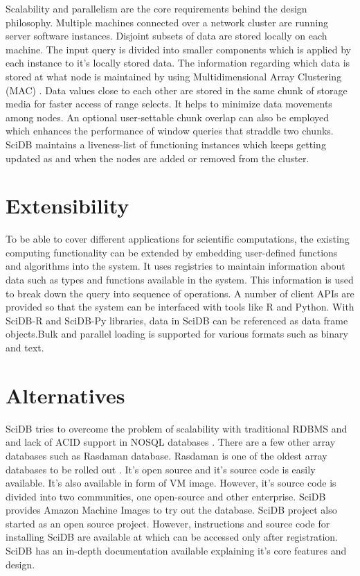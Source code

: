 \documentclass[9pt,twocolumn,twoside]{../../styles/osajnl}
\begin{document}
	Scalability and parallelism are the core requirements behind the design philosophy. Multiple machines connected over a network cluster are running server software instances. Disjoint subsets of data are stored locally on each machine. The input query is divided into smaller components which is applied by each instance to it's locally stored data. The information regarding which data is stored at what node is maintained by using Multidimensional Array Clustering (MAC) \cite{www-scidb-mac}. Data values close to each other are stored in the same chunk of storage media for faster access of range selects. It helps to minimize data movements among nodes. An optional user-settable chunk overlap can also be employed which enhances the performance of window queries that straddle two chunks. SciDB maintains a liveness-­list of functioning instances which keeps getting updated as and when the nodes are added or removed from the cluster. 
	
	\section{Extensibility}
	
	To be able to cover different applications for scientific computations, the existing computing functionality can be extended by embedding user-defined functions and algorithms into the system. It uses registries to maintain information about data such as types and functions available in the system. This information is used to break down the query into sequence of operations.  A number of client APIs are provided so that the system can be interfaced with tools like R and Python. With SciDB-­R and SciDB-­Py libraries, data in SciDB can be referenced as data frame objects.Bulk and parallel loading is supported for various formats such as binary and text. 
	
	
	\section{Alternatives}
	
	SciDB tries to overcome the problem of scalability with traditional RDBMS and and lack of ACID support in NOSQL databases \cite{www-stonebraker-interview}. There are a few other array databases such as Rasdaman database. Rasdaman is one of the oldest array databases to be rolled out \cite{www-rasdaman-impact}. It's open source and it's source code is easily available. It's also available in form of VM image. However, it's source code is divided into two communities, one open-source and other enterprise. SciDB provides Amazon Machine Images to try out the database. SciDB project also started as an open source project. However, instructions and source code for installing SciDB are available at \cite{www-scidb-releasenotes} which can be accessed only after registration. SciDB has an in-depth documentation available explaining it's core features and design.
	
\end{document}

